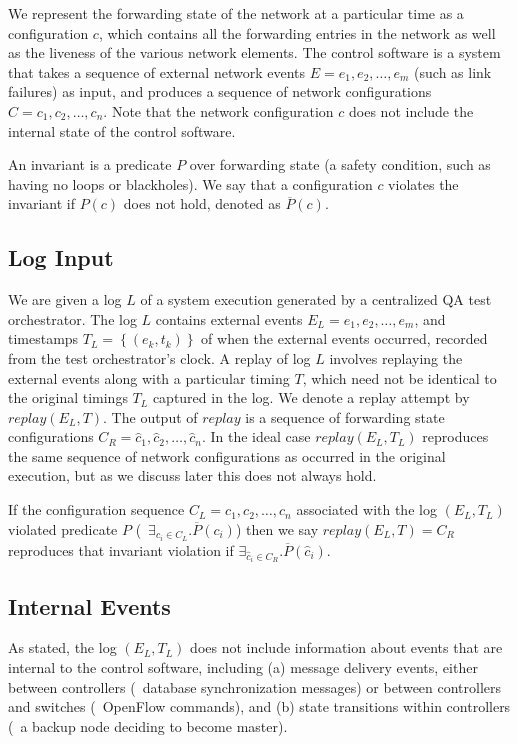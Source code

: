 We represent the forwarding state of the network
at a particular time as a configuration $c$, which contains all the forwarding
entries in the network
as well as the liveness of the various network elements.
The control software is a system %
that takes a sequence of
external network events $E = e_1,e_2,\dots,e_m$ (such as link failures) as input,
and produces a sequence of network configurations
$C = c_1,c_2,\dots,c_n$. Note that the network configuration $c$ does not
include the internal state of the control software.

An invariant is a predicate $P$ over forwarding state (a safety
condition, such as having no loops or blackholes). We say that a configuration
$c$ violates the invariant if $P(c)$ does not
hold, denoted as $\overline{P}(c)$.

\subsection{Log Input}

We are given a log $L$ of a system execution generated
by a centralized QA test orchestrator. The log $L$ contains external
events $E_L = e_1,e_2,\dots,e_m$, and
timestamps $T_L = \left\{ (e_k, t_k) \right\}$ of when the external events
occurred, recorded from the test orchestrator's clock.
A replay of log $L$ involves replaying the external events along with a
particular timing $T$,
which need not be identical to the original timings $T_L$ captured in the
log. We
denote a replay attempt by $replay(E_L,T)$.
The output of $replay$ is a sequence of forwarding state configurations
$C_R = \hat{c}_1,\hat{c}_2,\dots,\hat{c}_n$. In the ideal case $replay(E_L,T_L)$ reproduces the same
sequence of network configurations as occurred in the original execution, but as we discuss later
this does not always hold.

If the configuration sequence $C_L = c_1,c_2,\dots,c_n$ associated with the log $(E_L, T_L)$ violated predicate $P$
(\ie~$\exists_{c_i \in C_L}. \overline{P}(c_i)$)
then we say $replay(E_L,T) = C_R$ reproduces that invariant violation if
$\exists_{\hat{c}_i \in C_R}. \overline{P}(\hat{c}_i)$.

\subsection{Internal Events}

As stated, the log $(E_L, T_L)$ does not include
information about events that are internal to the control software, including
(a) message delivery events, either between controllers (\eg~database
synchronization messages) or
between controllers and switches (\eg~OpenFlow commands), and (b) state transitions
within controllers (\eg~a backup node deciding to become master).

